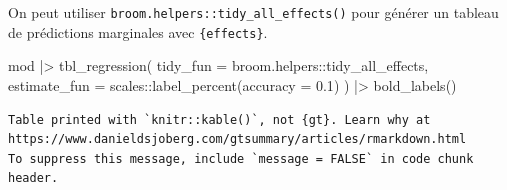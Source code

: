 \documentclass[
  letterpaper,
  DIV=11,
  numbers=noendperiod,
  oneside]{scrreprt}
\newenvironment{Shaded}{\begin{snugshade}}{\end{snugshade}}
\newcommand{\AttributeTok}[1]{\textcolor[rgb]{0.40,0.45,0.13}{#1}}
\newcommand{\FloatTok}[1]{\textcolor[rgb]{0.68,0.00,0.00}{#1}}
\newcommand{\FunctionTok}[1]{\textcolor[rgb]{0.28,0.35,0.67}{#1}}
\newcommand{\NormalTok}[1]{\textcolor[rgb]{0.00,0.23,0.31}{#1}}
\newcommand{\SpecialCharTok}[1]{\textcolor[rgb]{0.37,0.37,0.37}{#1}}
\begin{document}
On peut utiliser \texttt{broom.helpers::tidy\_all\_effects()} pour
générer un tableau de prédictions marginales avec \texttt{\{effects\}}.

\begin{Shaded}
\begin{Highlighting}[]
\NormalTok{mod }\SpecialCharTok{|\textgreater{}} 
  \FunctionTok{tbl\_regression}\NormalTok{(}
    \AttributeTok{tidy\_fun =}\NormalTok{ broom.helpers}\SpecialCharTok{::}\NormalTok{tidy\_all\_effects,}
    \AttributeTok{estimate\_fun =}\NormalTok{ scales}\SpecialCharTok{::}\FunctionTok{label\_percent}\NormalTok{(}\AttributeTok{accuracy =} \FloatTok{0.1}\NormalTok{)}
\NormalTok{  ) }\SpecialCharTok{|\textgreater{}} 
  \FunctionTok{bold\_labels}\NormalTok{()}
\end{Highlighting}
\end{Shaded}

\begin{verbatim}
Table printed with `knitr::kable()`, not {gt}. Learn why at
https://www.danieldsjoberg.com/gtsummary/articles/rmarkdown.html
To suppress this message, include `message = FALSE` in code chunk header.
\end{verbatim}
\end{document}

